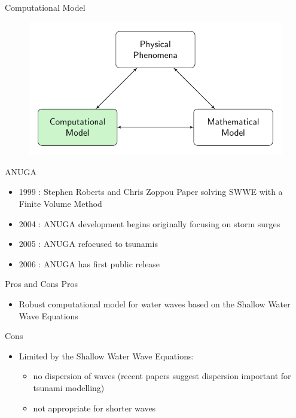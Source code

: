 \documentclass[pdf]{beamer}
\begin{document}
\begin{frame}{Computational Model}
		\begin{figure}
			\includegraphics[width=\textwidth]{./Pics/ModelDiagrams/FlowChartHigh3G.pdf}
		\end{figure}
\end{frame}

\begin{frame}{ANUGA}
	\begin{itemize}
		\item 1999 : Stephen Roberts and Chris Zoppou Paper solving SWWE with a Finite Volume Method
		\item 2004 : ANUGA development begins originally focusing on storm surges
		\item 2005 : ANUGA refocused to tsunamis
		\item 2006 : ANUGA has first public release
	\end{itemize}
\end{frame}


\begin{frame}{Pros and Cons}
	Pros
	\begin{itemize}
	\item Robust computational model for water waves based on the Shallow Water Wave Equations
	\end{itemize}
	\pause
	Cons
	\begin{itemize}
	\item Limited by the Shallow Water Wave Equations:
	\begin{itemize}
		\item no dispersion of waves (recent papers suggest dispersion important for tsunami modelling)
		\item not appropriate for shorter waves
	\end{itemize}
	\end{itemize}
\end{frame}
\end{document}
